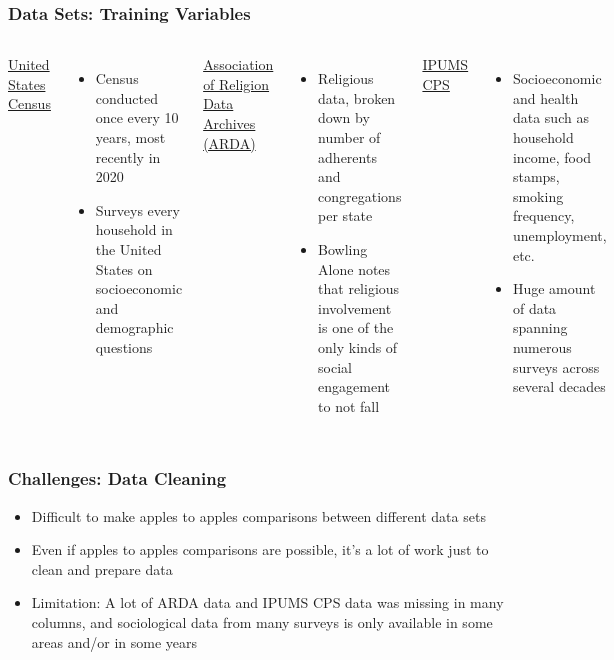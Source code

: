 \documentclass{beamer}
\begin{document}
\begin{frame}
    \frametitle{Data Sets: Training Variables}

    \begin{columns}[T]
        \uline{United States Census}

        \begin{itemize}
            \item Census conducted once every 10 years, most recently in 2020
            \item Surveys every household in the United States on socioeconomic and demographic questions
        \end{itemize}

        \uline{Association of Religion Data Archives (ARDA)}

        \begin{itemize}
            \item Religious data, broken down by number of adherents and congregations per state
            \item Bowling Alone notes that religious involvement is one of the only kinds of social engagement to not fall
        \end{itemize}

        \uline{IPUMS CPS}

        \begin{itemize}
            \item Socioeconomic and health data such as household income, food stamps, smoking frequency, unemployment, etc.
            \item Huge amount of data spanning numerous surveys across several decades
        \end{itemize}

    \end{columns}


\end{frame}

\begin{frame}

    \frametitle{Challenges: Data Cleaning}

    \begin{itemize}
        \item Difficult to make apples to apples comparisons between different data sets
        \item Even if apples to apples comparisons are possible, it's a lot of work just to clean and prepare data
        \item Limitation: A lot of ARDA data and IPUMS CPS data was missing in many columns, and sociological data from many surveys is only available in some areas and/or in some years
    \end{itemize}

\end{frame}
\end{document}
